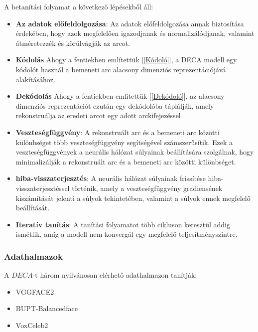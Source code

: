 \documentclass[12pt,a4]{article}
\begin{document}
                A betanítási folyamat a következő lépésekből áll:
                    \begin{itemize}
                        \item \textbf{Az adatok előfeldolgozása}: Az adatok előfeldolgozása annak biztosítása érdekében, hogy azok megfelelően igazodjanak és normalizálódjanak, valamint átméretezzék és körülvágják az arcot.
    
                        \item \textbf{Kódolás} Ahogy a fentiekben említettük [\ref{Kódoló}], a DECA modell egy kódolót használ a bemeneti arc alacsony dimenziós reprezentációjává alakításához. 
    
                        \item \textbf{Dekódolás} Ahogy a fentiekben említettük [\ref{Dekódoló}], az alacsony dimenziós reprezentációt ezután egy dekódolóba táplálják, amely rekonstruálja az eredeti arcot egy adott arckifejezéssel
    
                        \item \textbf{Veszteségfüggvény}: A rekonstruált arc és a bemeneti arc közötti különbséget több veszteségfüggvény segítségével számszerűsítik. Ezek a veszteségfüggvények a neurális hálózat súlyainak beállítására szolgálnak, hogy minimalizálják a rekonstruált arc és a bemeneti arc közötti különbséget.
    
                        \item \textbf{hiba-visszaterjesztés}: A neurális hálózat súlyainak frissítése hiba-visszaterjesztéssel történik, amely a veszteségfüggvény gradiensének kiszámítását jelenti a súlyok tekintetében, valamint a súlyok ennek megfelelő beállítását.
    
                        \item \textbf{Iteratív tanítás}: A tanítási folyamatot több cikluson keresztül addig ismétlik, amíg a modell nem konvergál egy megfelelő teljesítményszintre.
                    \end{itemize}
                
            \subsubsection{Adathalmazok}
                A $DECA$-t három nyilvánosan elérhető adathalmazon tanítják:
     	              \begin{itemize}
     	            	\item VGGFACE2
     	            	\item BUPT-Balancedface
     	            	\item VoxCeleb2
     	              \end{itemize}
    
\end{document}
